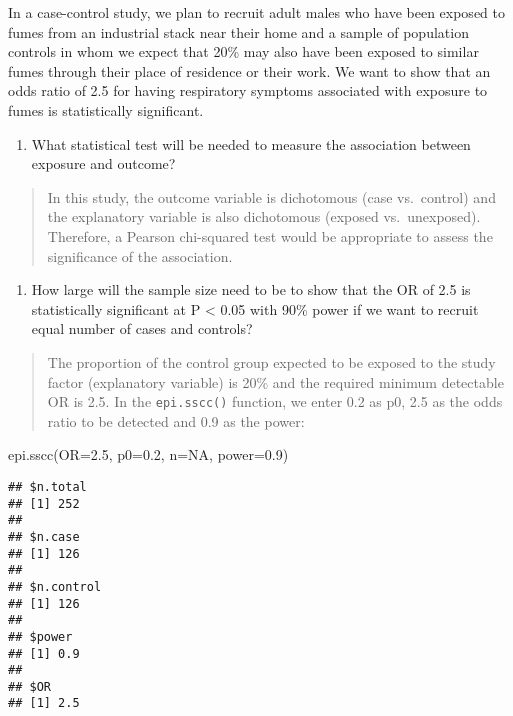 \documentclass[
]{memoir}
\newenvironment{Shaded}{\begin{snugshade}}{\end{snugshade}}
\newcommand{\AttributeTok}[1]{\textcolor[rgb]{0.77,0.63,0.00}{#1}}
\newcommand{\ConstantTok}[1]{\textcolor[rgb]{0.00,0.00,0.00}{#1}}
\newcommand{\FloatTok}[1]{\textcolor[rgb]{0.00,0.00,0.81}{#1}}
\newcommand{\FunctionTok}[1]{\textcolor[rgb]{0.00,0.00,0.00}{#1}}
\newcommand{\NormalTok}[1]{#1}
\providecommand{\tightlist}{%
  \setlength{\itemsep}{0pt}\setlength{\parskip}{0pt}}
\begin{document}
In a case-control study, we plan to recruit adult males who have been exposed to fumes from an industrial stack near their home and a sample of population controls in whom we expect that 20\% may also have been exposed to similar fumes through their place of residence or their work. We want to show that an odds ratio of 2.5 for having respiratory symptoms associated with exposure to fumes is statistically significant.

\begin{enumerate}
\def\labelenumi{\alph{enumi})}
\tightlist
\item
  What statistical test will be needed to measure the association between exposure and outcome?
\end{enumerate}

\begin{quote}
In this study, the outcome variable is dichotomous (case vs.~control) and the explanatory variable is also dichotomous (exposed vs.~unexposed). Therefore, a Pearson chi-squared test would be appropriate to assess the significance of the association.
\end{quote}

\begin{enumerate}
\def\labelenumi{\alph{enumi})}
\setcounter{enumi}{1}
\tightlist
\item
  How large will the sample size need to be to show that the OR of 2.5 is statistically significant at P \textless{} 0.05 with 90\% power if we want to recruit equal number of cases and controls?
\end{enumerate}

\begin{quote}
The proportion of the control group expected to be exposed to the study factor (explanatory variable) is 20\% and the required minimum detectable OR is 2.5. In the \texttt{epi.sscc()} function, we enter 0.2 as p0, 2.5 as the odds ratio to be detected and 0.9 as the power:
\end{quote}

\begin{Shaded}
\begin{Highlighting}[]
\FunctionTok{epi.sscc}\NormalTok{(}\AttributeTok{OR=}\FloatTok{2.5}\NormalTok{, }\AttributeTok{p0=}\FloatTok{0.2}\NormalTok{, }\AttributeTok{n=}\ConstantTok{NA}\NormalTok{, }\AttributeTok{power=}\FloatTok{0.9}\NormalTok{)}
\end{Highlighting}
\end{Shaded}

\begin{verbatim}
## $n.total
## [1] 252
## 
## $n.case
## [1] 126
## 
## $n.control
## [1] 126
## 
## $power
## [1] 0.9
## 
## $OR
## [1] 2.5
\end{verbatim}
\end{document}
